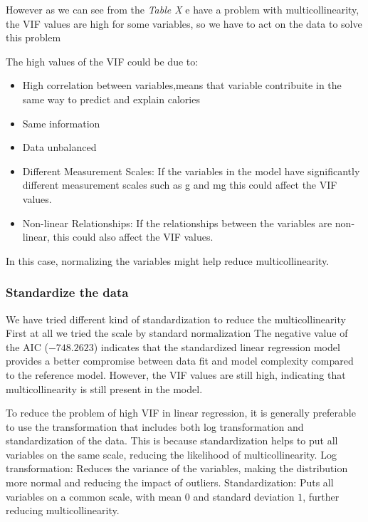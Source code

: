 \documentclass[
]{article}
\begin{document}
However as we can see from the \emph{Table X} e have a problem with
multicollinearity, the VIF values are high for some variables, so we
have to act on the data to solve this problem

The high values of the VIF could be due to:

\begin{itemize}
\item
  High correlation between variables,means that variable contribuite in
  the same way to predict and explain calories
\item
  Same information
\item
  Data unbalanced
\item
  Different Measurement Scales: If the variables in the model have
  significantly different measurement scales such as g and mg this could
  affect the VIF values.
\item
  Non-linear Relationships: If the relationships between the variables
  are non-linear, this could also affect the VIF values.
\end{itemize}

In this case, normalizing the variables might help reduce
multicollinearity.

\subsubsection{Standardize the data}\label{standardize-the-data}

We have tried different kind of standardization to reduce the
multicollinearity First at all we tried the scale by standard
normalization The negative value of the AIC (\(-748.2623\)) indicates
that the standardized linear regression model provides a better
compromise between data fit and model complexity compared to the
reference model. However, the VIF values are still high, indicating that
multicollinearity is still present in the model.

To reduce the problem of high VIF in linear regression, it is generally
preferable to use the transformation that includes both log
transformation and standardization of the data. This is because
standardization helps to put all variables on the same scale, reducing
the likelihood of multicollinearity. Log transformation: Reduces the
variance of the variables, making the distribution more normal and
reducing the impact of outliers. Standardization: Puts all variables on
a common scale, with mean \(0\) and standard deviation \(1\), further
reducing multicollinearity.
\end{document}
